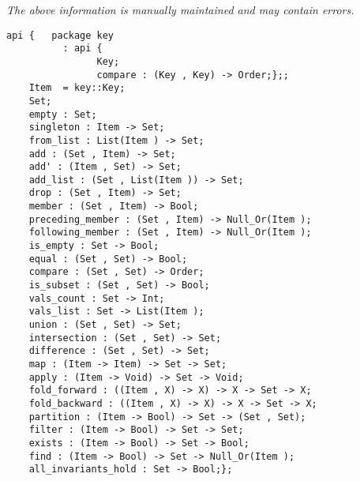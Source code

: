 \label{api:Set}

{\tiny \it The above information is manually maintained and may contain errors.}
\begin{verbatim}
api {   package key
          : api {
                Key;
                compare : (Key , Key) -> Order;};;
    Item  = key::Key;
    Set;
    empty : Set;
    singleton : Item -> Set;
    from_list : List(Item ) -> Set;
    add : (Set , Item) -> Set;
    add' : (Item , Set) -> Set;
    add_list : (Set , List(Item )) -> Set;
    drop : (Set , Item) -> Set;
    member : (Set , Item) -> Bool;
    preceding_member : (Set , Item) -> Null_Or(Item );
    following_member : (Set , Item) -> Null_Or(Item );
    is_empty : Set -> Bool;
    equal : (Set , Set) -> Bool;
    compare : (Set , Set) -> Order;
    is_subset : (Set , Set) -> Bool;
    vals_count : Set -> Int;
    vals_list : Set -> List(Item );
    union : (Set , Set) -> Set;
    intersection : (Set , Set) -> Set;
    difference : (Set , Set) -> Set;
    map : (Item -> Item) -> Set -> Set;
    apply : (Item -> Void) -> Set -> Void;
    fold_forward : ((Item , X) -> X) -> X -> Set -> X;
    fold_backward : ((Item , X) -> X) -> X -> Set -> X;
    partition : (Item -> Bool) -> Set -> (Set , Set);
    filter : (Item -> Bool) -> Set -> Set;
    exists : (Item -> Bool) -> Set -> Bool;
    find : (Item -> Bool) -> Set -> Null_Or(Item );
    all_invariants_hold : Set -> Bool;};
\end{verbatim}
